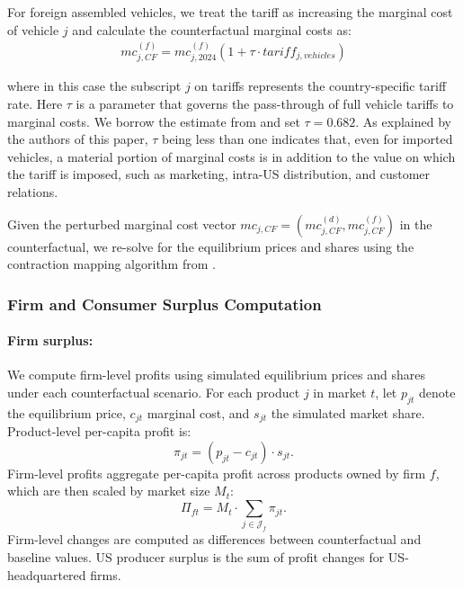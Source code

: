 \documentclass[11pt]{article}
\begin{document}
For foreign assembled vehicles, we treat the tariff as increasing the marginal cost of vehicle $j$ and calculate the counterfactual marginal costs as:
\begin{align}
    mc^{(f)}_{j,CF} = mc^{(f)}_{j,2024} (1+  \tau \cdot  tariff_{j,vehicles})
\end{align}

\noindent where in this case the subscript $j$ on tariffs represents the country-specific tariff rate. Here $\tau$ is a parameter that governs the pass-through of full vehicle tariffs to marginal costs. We borrow the estimate from \cite{cosar_what_2018} and set $\tau = 0.682$. As explained by the authors of this paper, $\tau$ being less than one indicates that, even for imported vehicles, a material portion of marginal costs is in addition to the value on which the tariff is imposed, such as marketing, intra-US distribution, and customer relations.

Given the perturbed marginal cost vector $mc_{j,CF} = (mc_{j,CF}^{(d)}, mc_{j,CF}^{(f)})$ in the counterfactual, we re-solve for the equilibrium prices and shares using the contraction mapping algorithm from \cite{morrow_fixed-point_2011}.

\subsubsection{Firm and Consumer Surplus Computation}

\paragraph{Firm surplus:}
We compute firm-level profits using simulated equilibrium prices and shares under each counterfactual scenario. For each product \(j\) in market \(t\), let \(p_{jt}\) denote the equilibrium price, \(c_{jt}\) marginal cost, and \(s_{jt}\) the simulated market share. Product-level per-capita profit is:
\begin{equation}
\pi_{jt} = (p_{jt} - c_{jt}) \cdot s_{jt}.
\end{equation}
Firm-level profits aggregate per-capita profit across products owned by firm \(f\), which are then scaled by market size $M_t$:
\begin{equation}
\Pi_{ft} = M_t\cdot\sum_{j \in \mathcal{J}_f} \pi_{jt}.
\end{equation}
Firm-level changes are computed as differences between counterfactual and baseline values. US producer surplus is the sum of profit changes for US-headquartered firms.
\end{document}
